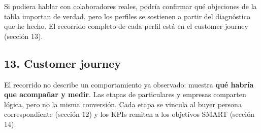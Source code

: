 \documentclass[
]{article}
\begin{document}
Si pudiera hablar con colaboradores reales, podría confirmar qué
objeciones de la tabla importan de verdad, pero los perfiles se
sostienen a partir del diagnóstico que he hecho. El recorrido completo
de cada perfil está en el customer journey (sección 13).

\hypertarget{customer-journey}{%
\subsection{13. Customer journey}\label{customer-journey}}

El recorrido no describe un comportamiento ya observado: muestra
\textbf{qué habría que acompañar y medir}. Las etapas de particulares y
empresas comparten lógica, pero no la misma conversión. Cada etapa se
vincula al buyer persona correspondiente (sección 12) y los KPIs remiten
a los objetivos SMART (sección 14).
\end{document}
